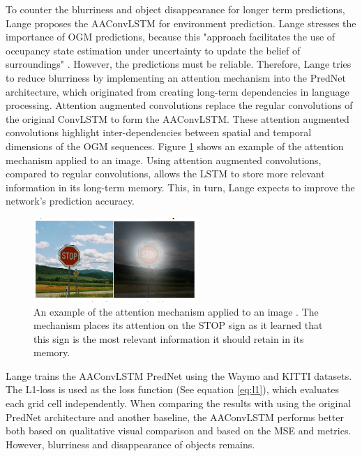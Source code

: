 To counter the blurriness and object disappearance for longer term predictions, Lange \cite{lange2020attention} proposes the \gls{AAConvLSTM} for environment prediction. Lange \cite{lange2020attention} stresses the importance of \gls{OGM} predictions, because this "approach facilitates the use of occupancy state estimation under uncertainty to update the belief of surroundings" \cite{lange2020attention}. However, the predictions must be reliable. Therefore, Lange \cite{lange2020attention} tries to reduce blurriness by implementing an attention mechanism into the PredNet architecture, which originated from creating long-term dependencies in language processing. Attention augmented convolutions replace the regular convolutions of the original \gls{ConvLSTM} to form the \gls{AAConvLSTM}. These attention augmented convolutions highlight inter-dependencies between spatial and temporal dimensions of the \gls{OGM} sequences. Figure \ref{fig:attention_example} shows an example of the attention mechanism applied to an image. Using attention augmented convolutions, compared to regular convolutions, allows the \gls{LSTM} to store more relevant information in its long-term memory. This, in turn, Lange \cite{lange2020attention} expects to improve the network's prediction accuracy. \\

\begin{figure}[h]
	\centering
	\includegraphics[width=0.7\linewidth]{Figures/Methods/Attention}
	\caption{An example of the attention mechanism applied to an image \cite{xu2015show}. The mechanism places its attention on the STOP sign as it learned that this sign is the most relevant information it should retain in its memory.}
	\label{fig:attention_example}
\end{figure}

Lange \cite{lange2020attention} trains the \gls{AAConvLSTM} PredNet using the Waymo \cite{sun2020scalability} and \gls{KITTI} \cite{geiger2013vision} datasets. The L1-loss is used as the loss function (See equation \ref{eq:l1}), which evaluates each grid cell independently. When comparing the results with using the original PredNet architecture and another baseline, the \gls{AAConvLSTM} performs better both based on qualitative visual comparison and based on the \gls{MSE} and  metrics. However, blurriness and disappearance of objects remains. \\

